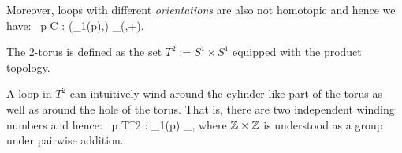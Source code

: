 Moreover, loops with different \emph{orientations} are also not homotopic and hence we have:
\bse
\forall \, p \in C : (\pi_1(p),\bullet) \cong_(\Z,+).
\ese
\ee

\be
The 2-torus is defined as the set $T^2:=S^1\times S^1$ equipped with the product topology.
\begin{center}
\end{center}
A loop in $T^2$ can intuitively wind around the cylinder-like part of the torus as well as around the hole of the torus. That is, there are two independent winding numbers and hence:
\bse
\forall \, p \in T^2 : \pi_1(p) \cong_\Z\times \Z,
\ese
where $\mathbb{Z}\times \mathbb{Z}$ is understood as a group under pairwise addition.
\ee
